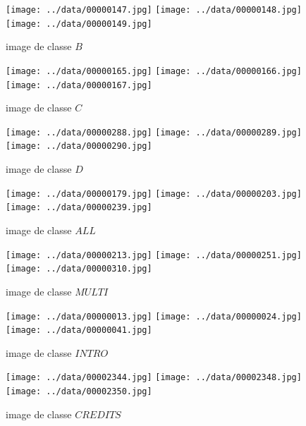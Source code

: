 \documentclass{book}
\begin{document}
\begin{figure}[H]
\begin{center}
\texttt{[image: ../data/00000147.jpg]}
\texttt{[image: ../data/00000148.jpg]}
\texttt{[image: ../data/00000149.jpg]}
\end{center}
\caption{image de classe $B$}
\label{classeB}
\end{figure}

\begin{figure}[H]
\begin{center}
\texttt{[image: ../data/00000165.jpg]}
\texttt{[image: ../data/00000166.jpg]}
\texttt{[image: ../data/00000167.jpg]}
\end{center}
\caption{image de classe $C$}
\label{classeC}
\end{figure}

\begin{figure}[H]
\begin{center}
\texttt{[image: ../data/00000288.jpg]}
\texttt{[image: ../data/00000289.jpg]}
\texttt{[image: ../data/00000290.jpg]}
\end{center}
\caption{image de classe $D$}
\label{classeD}
\end{figure}

\begin{figure}[H]
\begin{center}
\texttt{[image: ../data/00000179.jpg]}
\texttt{[image: ../data/00000203.jpg]}
\texttt{[image: ../data/00000239.jpg]}
\end{center}
\caption{image de classe $ALL$}
\label{classeALL}
\end{figure}

\begin{figure}[H]
\begin{center}
\texttt{[image: ../data/00000213.jpg]}
\texttt{[image: ../data/00000251.jpg]}
\texttt{[image: ../data/00000310.jpg]}
\end{center}
\caption{image de classe $MULTI$}
\label{classeMULTI}
\end{figure}

\begin{figure}[H]
\begin{center}
\texttt{[image: ../data/00000013.jpg]}
\texttt{[image: ../data/00000024.jpg]}
\texttt{[image: ../data/00000041.jpg]}
\end{center}
\caption{image de classe $INTRO$}
\label{classeINTRO}
\end{figure}

\begin{figure}
\begin{center}
\texttt{[image: ../data/00002344.jpg]}
\texttt{[image: ../data/00002348.jpg]}
\texttt{[image: ../data/00002350.jpg]}
\end{center}
\caption{image de classe $CREDITS$}
\label{classeCREDITS}
\end{figure}
\end{document}
